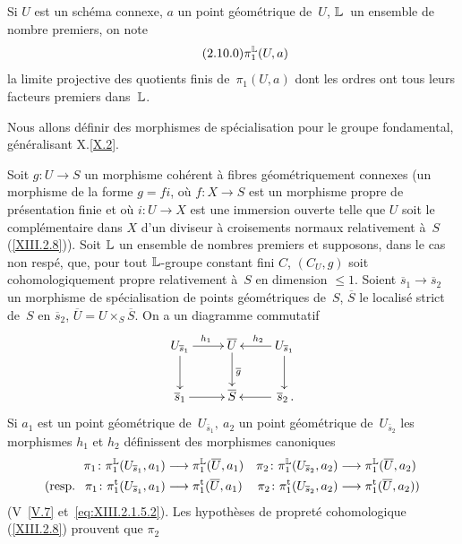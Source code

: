 \subsection{}
\label{XIII.2.10}
Si $U$ est un sch\'ema connexe, $a$ un point g\'eom\'etrique
de~$U$, $\mathbb{L}$~un ensemble de nombre premiers, on note
\begin{equation*}
\label{eq:XIII.2.10.0}
\tag{2.10.0} \pi_1^{\mathbb{L}}(U,a)
\end{equation*}
\label{indnot:mi}la limite projective des quotients finis de~$\pi_1(U,a)$ dont les
ordres ont tous leurs facteurs premiers dans~$\mathbb{L}$.

Nous allons d\'efinir des morphismes de sp\'ecialisation pour le
groupe fondamental, g\'e\-n\'e\-ra\-li\-sant X.\ref{X.2}.

Soit $g\colon U\to S$ un morphisme coh\'erent \`a fibres
g\'eom\'etriquement connexes (\resp un morphisme de la forme $g=
fi$, o\`u $f\colon X \to S$ est un morphisme propre de
pr\'esentation finie et o\`u $i\colon U\to X$ est une
immersion ouverte telle que $U$ soit le compl\'ementaire dans $X$
d'un diviseur \`a croisements normaux relativement \`a~$S$
(\cf \ref{XIII.2.8})). Soit ${\mathbb{L}}$ un ensemble de nombres premiers et
supposons, dans le cas non resp\'e, que, pour tout ${\mathbb{L}}$-groupe
constant fini $C$, $(C_U,g)$ soit cohomologiquement propre
relativement \`a~$S$ en dimension $\leq 1$. Soient $\overline{s}_1
\to \overline{s}_2$ un morphisme de sp\'ecialisation de
points g\'eom\'etriques de~$S$, $\overline{S}$ le localis\'e
strict de~$S$ en $\overline{s}_2$,
$\overline{U}=U\times_S\overline{S}$. On a un diagramme commutatif
$$
\xymatrix{{U_{\bar{s}_1}}\ar[r]^{h_1}\ar[d]&{\bar{U}}\ar[d]^{\bar{g}}&{U_{\bar{s}_1}}\ar[l]_{h_2}\ar[d]\\{\bar{s}_1}\ar[r]&{\bar{S}}&{\,\bar{s}_2\,.}\ar[l]}
$$
Si $a_1$ est un point g\'eom\'etrique de~$U_{\bar{s}_1},\ a_2$ un
point g\'eom\'etrique de~$U_{\bar{s}_2}$ les morphismes $h_1$ et
$h_2$ d\'efinissent des morphismes canoniques
\begin{align*}
\pi_1\colon \pi_1^{\LL}(U_{\bar{s}_1},a_1)&\to
\pi_1^{\LL}(\bar{U},a_1) & \pi_2\colon
\pi_1^{\LL}(U_{\bar{s}_2},a_2)&\to \pi_1^{\LL}(\bar{U},a_2)\\
(\text{\resp~} \pi_1\colon \pi_1^\tame (U_{\bar{s}_1},a_1)&\to
\pi_1^\tame (\bar{U},a_1) & \pi_2\colon
\pi_1^\tame(U_{\bar{s}_2},a_2)&\to \pi_1^\tame(\bar{U},a_2))
\end{align*}
(V~\ref{V.7} et~\ref{eq:XIII.2.1.5.2}). Les hypoth\`eses de
propret\'e cohomologique (\resp \ref{XIII.2.8}) prouvent que $\pi_2$
